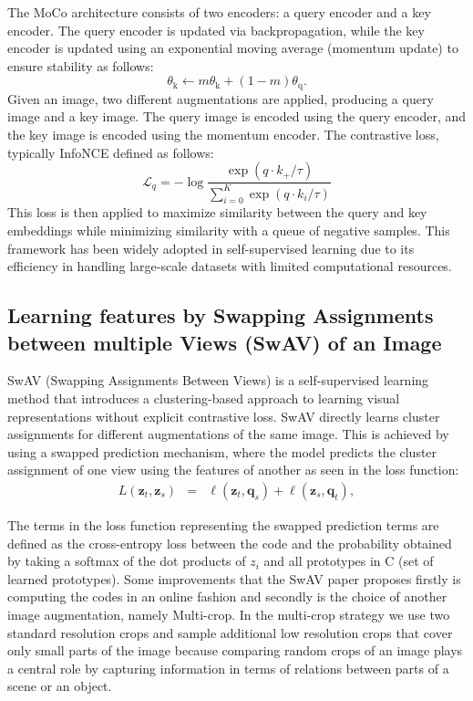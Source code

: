 The MoCo architecture consists of two encoders: a query encoder and a key encoder. The query encoder is updated via backpropagation, while the key encoder is updated using an exponential moving average (momentum update) to ensure stability as follows:
\begin{equation}
\theta_\textrm{k} \leftarrow m \theta_\textrm{k} + (1 - m) \theta_\textrm{q}.
\label{eq:moco}
\end{equation}
Given an image, two different augmentations are applied, producing a query image and a key image. The query image is encoded using the query encoder, and the key image is encoded using the momentum encoder. The contrastive loss, typically InfoNCE defined as follows:
\begin{equation}
\mathcal{L}_q = -\log \frac{\exp(q{\cdot}k_+ / \tau)}{\sum_{i=0}^{K}\exp(q{\cdot}k_i  / \tau)}
\label{eq:infonce}
\end{equation}
This loss is then applied to maximize similarity between the query and key embeddings while minimizing similarity with a queue of negative samples. This framework has been widely adopted in self-supervised learning due to its efficiency in handling large-scale datasets with limited computational resources.

\subsection{Learning features by Swapping Assignments between multiple Views (SwAV) of an Image}

SwAV (Swapping Assignments Between Views) \cite{caron2020unsupervised} is a self-supervised learning method that introduces a clustering-based approach to learning visual representations without explicit contrastive loss. SwAV directly learns cluster assignments for different augmentations of the same image. This is achieved by using a swapped prediction mechanism, where the model predicts the cluster assignment of one view using the features of another as seen in the loss function:
\begin{eqnarray}
L(\mathbf{z}_t, \mathbf{z}_s) & = &\ell(\mathbf{z}_t, \mathbf{q}_s) + \ell(\mathbf{z}_s, \mathbf{q}_t),
\label{eq:twoviews}
\end{eqnarray}

The terms in the loss function representing the swapped prediction terms are defined as the cross-entropy loss between the code and the probability obtained by taking a softmax of the dot products of ${z_i}$ and all prototypes in C (set of learned prototypes). Some improvements that the SwAV paper proposes firstly is computing the codes in an online fashion and secondly is the choice of another image augmentation, namely Multi-crop. In the multi-crop strategy we use two standard resolution crops and sample additional low resolution crops that cover only small parts of the image because comparing random crops of an image plays a central role by capturing information in terms of relations between parts of a scene or an object.

